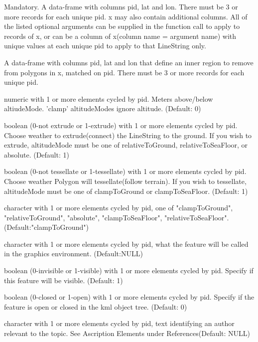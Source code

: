 \documentclass[a4paper]{book}
\begin{document}
\begin{Arguments}
\begin{ldescription}

\item[\code{x}] Mandatory. A data-frame with columns pid, lat and lon. There must be 3 or more records for each unique pid. x may also contain additional columns. All of the listed optional arguments can be supplied in the function call to apply to records of x, or can be a column of x(column name = argument name) with unique values at each unique pid to apply to that LineString only.  
\item[\code{y}] A data-frame with columns pid, lat and lon that define an inner region to remove from polygons in x, matched on pid. There must be 3 or more records for each unique pid.
\item[\code{altitude}] numeric with 1 or more elements cycled by pid. Meters above/below altiudeMode. 'clamp' altitudeModes ignore altitude. (Default: 0)
\item[\code{extrude}] boolean (0-not extrude or 1-extrude) with 1 or more elements cycled by pid. Choose weather to extrude(connect) the LineString to the ground. If you wish to extrude, altitudeMode must be one of relativeToGround, relativeToSeaFloor, or absolute. (Default: 1)
\item[\code{tessellate}] boolean (0-not tessellate or 1-tessellate) with 1 or more elements cycled by pid. Choose weather Polygon will tessellate(follow terrain). If you wish to tessellate, altitudeMode must be one of clampToGround or clampToSeaFloor. (Default: 1)
\item[\code{altitudeMode}] character with 1 or more elements cycled by pid, one of "clampToGround", "relativeToGround", "absolute", "clampToSeaFloor", "relativeToSeaFloor". (Default:"clampToGround")
\item[\code{name}] character with 1 or more elements cycled by pid, what the feature will be called in the graphics environment. (Default:NULL) 
\item[\code{visibility}] boolean (0-invisible or 1-visible) with 1 or more elements cycled by pid. Specify if this feature will be visible. (Default: 1)
\item[\code{open}]  boolean (0-closed or 1-open) with 1 or more elements cycled by pid. Specify if the feature is open or closed in the kml object tree. (Default: 0)
\item[\code{atomauthor}]  character with 1 or more elements cycled by pid, text identifying an author relevant to the topic. See Ascription Elements under References(Default: NULL) 

\end{ldescription}
\end{Arguments}
\end{document}
